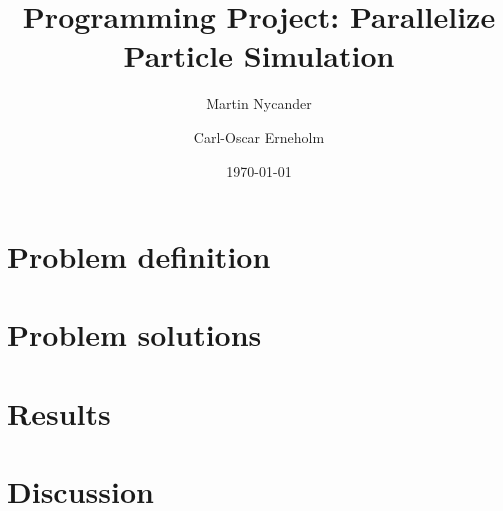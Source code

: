 \documentclass[titlepage,a4paper,10pt]{article}
\title{Programming Project: Parallelize Particle Simulation}
\author{Martin Nycander \and Carl-Oscar Erneholm}
\date{\today}
\begin{document}
\maketitle

\section{Problem definition}

\section{Problem solutions}




\section{Results}




\section{Discussion}

\end{document}
